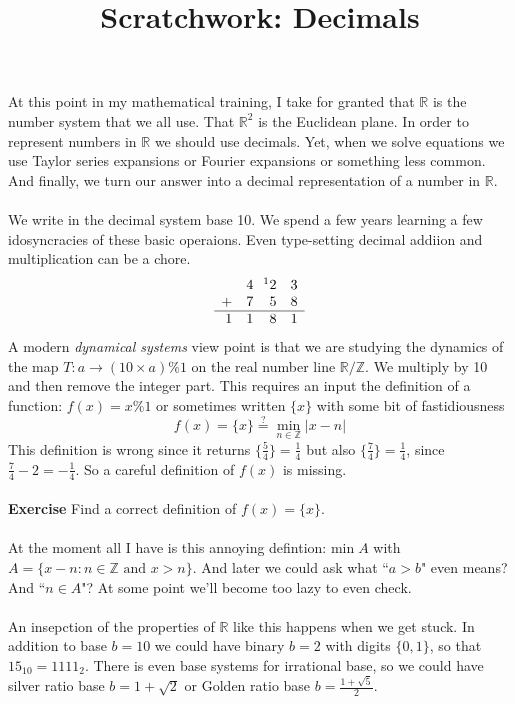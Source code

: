 \documentclass[12pt]{article}
\title{Scratchwork: Decimals}
\date{}
\begin{document}
\sffamily

\maketitle

\noindent At this point in my mathematical training, I take for granted that $\mathbb{R}$ is the number system that we all use.  That $\mathbb{R}^2$ is the Euclidean plane.  In order to represent numbers in $\mathbb{R}$ we should use decimals.  Yet, when we solve equations we use Taylor series expansions or Fourier expansions or something less common.  And finally, we turn our answer into a decimal representation of a number in $\mathbb{R}$. \\ \\
We write in the decimal system base 10. We spend a few years learning a few idosyncracies of these basic operaions.  Even type-setting decimal addiion and multiplication can be a chore.  
$$ 
\begin{array}{rrrr} 
  & 4 & \hspace{-3pt}{}^12 & 3 \\
+ & 7 & 5 & 8 \\ \hline
 1 & 1 & 8 &1
\end{array} $$
A modern \textit{dynamical systems} view point is that we are studying the dynamics of the map $T: a \to (10 \times a) \% 1$ on the real number line $\mathbb{R}/\mathbb{Z}$. We multiply by 10 and then remove the integer part.   This requires an input the definition of a function: $f(x) = x \% 1 $ or sometimes written $\{ x \} $ with some bit of fastidiousness
$$ f(x) = \{ x \}   \stackrel{?}{=}  \min_{n \in \mathbb{Z}} | x - n|  $$
This definition is wrong since it returns $\{ \frac{5}{4}\} = \frac{1}{4}$ but also $\{\frac{7}{4}\} = \frac{1}{4}$, since $\frac{7}{4} - 2  = - \frac{1}{4} $.  So a careful definition of $f(x)$ is missing. \\ \\
\textbf{Exercise} Find a correct definition of $f(x) = \{ x\}$. \\ \\
At the moment all I have is this annoying defintion: $\text{min}\;A$ with $A= \{ x - n : n \in \mathbb{Z} \text{ and } x > n \}$.  And later we could ask what ``$a > b$" even means? And ``$n \in A$"?  At some point we'll become too lazy to even check. \\ \\
An insepction of the properties of $\mathbb{R}$ like this happens when we get stuck.  In addition to base $b = 10$ we could have binary $b = 2$ with digits $\{ 0, 1\}$, so that $15_{10} = 1111_2$.  There is even base systems for irrational base, so we could have silver ratio base $b = 1 + \sqrt{2}$ or Golden ratio base $b= \frac{1 + \sqrt{5}}{2}$. \\ \\
\end{document}
